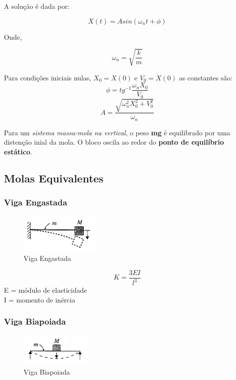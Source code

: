 \documentclass[a4paper, 12pt]{article}
\begin{document}
	A solução é dada por:
	
	\begin{equation}
	\boxed{X(t) = A sin(\omega_n t + \phi)}
	\end{equation}
	
	Onde,
	
	\begin{equation}
	\boxed{\omega_n = \sqrt{\frac{k}{m}}}
	\end{equation}

	Para condições iniciais nulas, $X_0 = X(0)$ e $V_0 = \dot{X}(0)$ as constantes são:
	\begin{equation}
	\boxed{\phi = tg^{-1} \frac{\omega_n X_0}{V_0}}
	\end{equation}
	\begin{equation}
	\boxed{A = \frac{\sqrt{\omega_n^2 X_0^2 + V_0^2}}{\omega_n}}
	\end{equation}

	Para um \textit{sistema massa-mola na vertical}, o peso \textbf{mg} é equilibrado por uma distenção inial da mola. O bloco oscila ao redor do \textbf{ponto de equilíbrio estático}.

\subsection{Molas Equivalentes}
\newpage
\subsubsection{Viga Engastada}
	\begin{figure}[h]
	\centering
	\includegraphics[scale=1.5]{a1.png}
	\caption{Viga Engastada}
	\end{figure}
	
	\begin{equation}
	K = \frac{3EI}{l^3}
	\end{equation}
	E = módulo de elasticidade\\
	I = momento de inércia
	
\subsubsection{Viga Biapoiada}
	\begin{figure}[h]
	\centering
	\includegraphics[scale=1.5]{a2.png}
	\caption{Viga Biapoiada}
	\end{figure}
	
\end{document}
